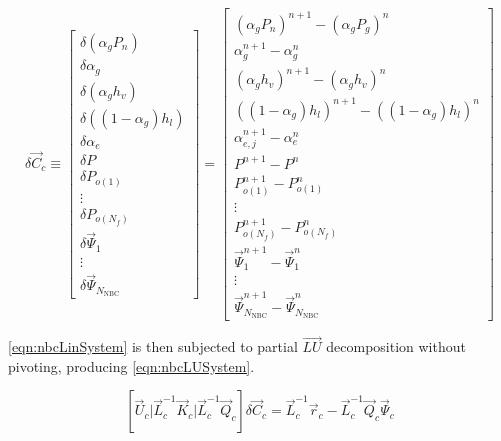 \begin{equation}
\label{eqn:nbcUpdate}
\delta \vec{C}_{c} \equiv 
\begin{bmatrix}
\delta ( \alpha_{g} P_{n} ) \\
\delta \alpha_{g} \\
\delta ( \alpha_{g} h_v ) \\
\delta ( (1 - \alpha_{g} ) h_l ) \\
\delta \alpha_{e} \\
\delta P \\ 
\delta P_{o(1)} \\
\vdots \\
\delta P_{o(N_{f})} \\
\delta \vec{\Psi}_{1} \\
\vdots \\
\delta \vec{\Psi}_{N_{\text{NBC}}}
\end{bmatrix}
=
\begin{bmatrix}
( \alpha_{g} P_{n})^{n+1} - (\alpha_{g} P_{g} )^{n} \\
\alpha^{n+1}_{g} - \alpha^{n}_{g} \\
( \alpha_{g} h_{v} )^{n+1} - ( \alpha_{g} h_{v} )^{n} \\
( ( 1 - \alpha_{g} ) h_{l} )^{n+1} - ( ( 1 - \alpha_{g} ) h_{l} )^{n} \\
\alpha^{n+1}_{e,j} - \alpha^{n}_{e} \\
 P^{n+1} - P^{n} \\
 P_{o(1)}^{n+1} - P_{o(1)}^{n} \\
 \vdots \\
 P_{o(N_{f})}^{n+1} - P_{o(N_{f})}^{n} \\
 \vec{\Psi}_{1}^{n+1} - \vec{\Psi}_{1}^{n} \\
 \vdots \\
 \vec{\Psi}_{N_{\text{NBC}}}^{n+1} - \vec{\Psi}_{N_{\text{NBC}}}^{n}
\end{bmatrix}
\end{equation}

\eqref{eqn:nbcLinSystem} is then subjected to partial $\vec{LU}$ decomposition without pivoting, producing \eqref{eqn:nbcLUSystem}.

\begin{equation}
\label{eqn:nbcLUSystem}
\left[ \vec{U}_{c} \vert \vec{L}^{-1}_{c}\vec{K}_{c} \vert \vec{L}^{-1}_{c}\vec{Q}_{c} \right] \delta \vec{C}_{c} = \vec{L}^{-1}_{c}\vec{r}_{c}  -\vec{L}^{-1}_{c}\vec{Q}_{c}\vec{\Psi}_{c}
\end{equation}

